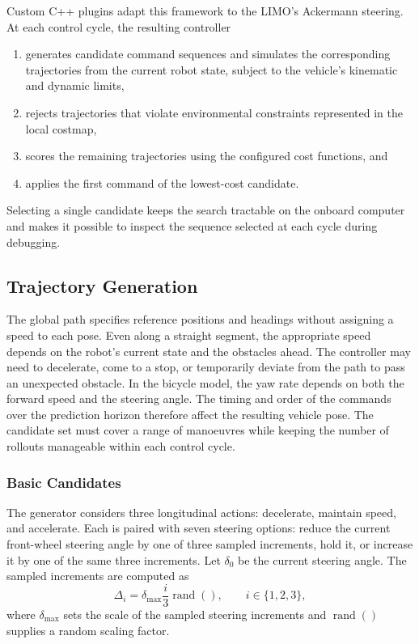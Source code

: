 \documentclass[a4paper,11pt,oneside]{book}
\begin{document}
Custom C++ plugins adapt this framework to the LIMO's Ackermann
steering. At each control cycle, the resulting controller
\begin{enumerate}
    \item generates candidate command sequences and simulates the
          corresponding trajectories from the current robot state,
          subject to the vehicle's kinematic and dynamic limits,
    \item rejects trajectories that violate environmental constraints
          represented in the local costmap,
    \item scores the remaining trajectories using the configured cost
          functions, and
    \item applies the first command of the lowest-cost candidate.
\end{enumerate}

Selecting a single candidate keeps the search tractable on the onboard
computer and makes it possible to inspect the sequence selected at
each cycle during debugging.

\subsection{Trajectory Generation}
\label{subsec:control_trajectory_generation}

The global path specifies reference positions and headings without
assigning a speed to each pose. Even along a straight segment, the
appropriate speed depends on the robot's current state and the
obstacles ahead. The controller may need to decelerate, come to a stop,
or temporarily deviate from the path to pass an unexpected obstacle.
In the bicycle model, the yaw rate depends on both the forward speed
and the steering angle. The timing and order of the commands over the
prediction horizon therefore affect the resulting vehicle pose. The
candidate set must cover a range of manoeuvres while keeping the
number of rollouts manageable within each control cycle.

\subsubsection{Basic Candidates}

The generator considers three longitudinal actions: decelerate,
maintain speed, and accelerate. Each is paired with seven steering
options: reduce the current front-wheel steering angle by one of
three sampled increments, hold it, or increase it by one of the same
three increments. Let \(\delta_0\) be the current steering angle.
The sampled increments are computed as
\begin{equation}
    \Delta_i = \delta_{\max}\frac{i}{3}\operatorname{rand}(),
    \qquad i\in\{1,2,3\},
    \label{eq:control_steering_increments}
\end{equation}
where \(\delta_{\max}\) sets the scale of the sampled steering
increments and \(\operatorname{rand}()\) supplies a random scaling
factor.
\end{document}
